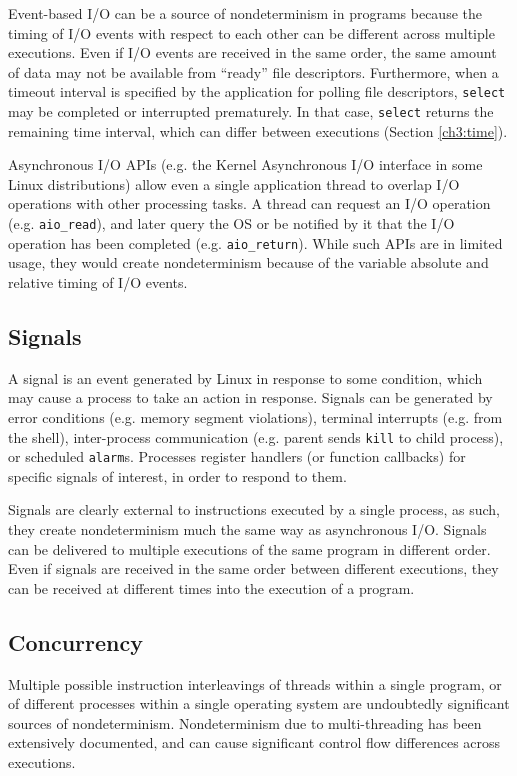 Event-based I/O can be a source
of nondeterminism in programs because the
timing of I/O events with respect to each other
can be different across multiple executions.
Even if I/O events are received in the same order,
the same amount of data may not be available
from ``ready'' file descriptors. Furthermore, when a timeout
interval is specified by the application for polling file descriptors,
\texttt{select} may be completed or interrupted
prematurely. In that case, \texttt{select} returns
the remaining time interval, which can     
differ between executions (Section \ref{ch3:time}). \newline

 \newline
Asynchronous I/O APIs (e.g. the Kernel Asynchronous I/O interface
in some Linux distributions) allow even a single application
thread to overlap I/O operations with other processing
tasks. A thread can request an I/O operation (e.g. \texttt{aio\_read}),
and later query the OS or be notified by it that the I/O operation
has been completed (e.g. \texttt{aio\_return}). While such APIs are in limited
usage, they would create nondeterminism because of the
variable absolute and relative timing of I/O events.

\subsection{Signals}\label{ch3:sig}
A signal is an event generated by Linux
in response to some condition, which may cause
a process to take an action in response.
Signals can be generated by error conditions
(e.g. memory segment violations), 
terminal interrupts (e.g. from the shell), 
inter-process communication (e.g. parent 
sends \texttt{kill} to child process),
or scheduled \texttt{alarm}s. 
Processes register handlers (or function callbacks) for specific signals
of interest, in order to respond to them.

Signals are clearly external to
instructions executed by a single process,
as such, they create nondeterminism 
much the same way as asynchronous I/O.
Signals can be delivered to multiple executions
of the same program in different order.
Even if signals are received in the
same order between different executions,
they can be received at different times
into the execution of a program.

\subsection{Concurrency} \label{ch3:concurrency}
Multiple possible instruction interleavings of 
threads within a single program, 
or of different processes within 
a single operating system are
undoubtedly significant sources
of nondeterminism.
Nondeterminism due to
multi-threading has been extensively
documented, and can cause
significant control flow differences
across executions.

